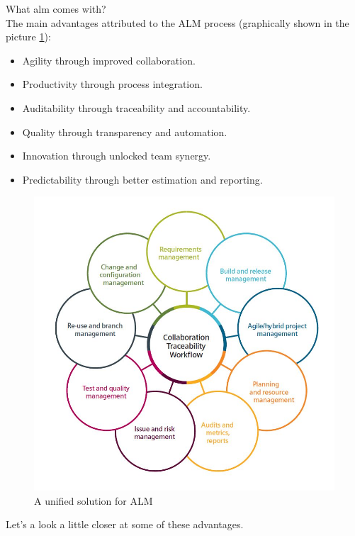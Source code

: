 \documentclass[thesis=M,english]{FITthesis}[2012/06/26]
\begin{document}
What \acrshort{alm} comes with?\\

The main advantages attributed to the ALM process (graphically shown in the picture \ref{fig:alm_unified_solutionc}):
\begin{itemize}[nosep]
	\item Agility through improved collaboration.
	\item Productivity through process integration.
	\item Auditability through traceability and accountability.
	\item Quality through transparency and automation.
	\item Innovation through unlocked team synergy.
	\item Predictability through better estimation and reporting.\\
\end{itemize}

\begin{figure}[h!]\centering
	\includegraphics[width=1\textwidth]{pictures/alm_unified_processes}
	\caption{A unified solution for ALM \cite{polarion_alm}}\label{fig:alm_unified_solutionc}
\end{figure}

Let's a look a little closer at some of these advantages.
\end{document}
